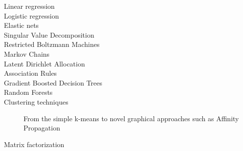 \begin{description}
    \item[Linear regression]
    \item[Logistic regression]
    \item[Elastic nets]
    \item[Singular Value Decomposition]
    \item[Restricted Boltzmann Machines]
    \item[Markov Chains]
    \item[Latent Dirichlet Allocation]
    \item[Association Rules]
    \item[Gradient Boosted Decision Trees]
    \item[Random Forests]
    \item[Clustering techniques] \hfill
        From the simple k-means to novel graphical approaches such as Affinity Propagation
    \item[Matrix factorization]
\end{description}


